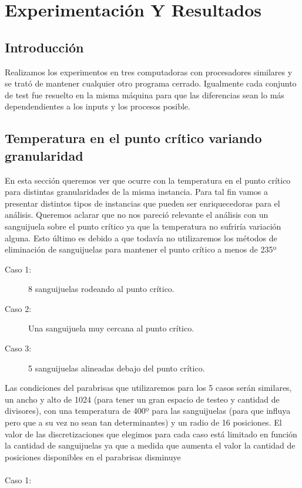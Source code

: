 \clearpage
\section{Experimentación Y Resultados}

\subsection{Introducción}
 Realizamos los experimentos en tres computadoras con procesadores similares y se trató de mantener cualquier otro programa cerrado. Igualmente cada conjunto de test fue resuelto en la misma máquina para que las diferencias sean lo más dependendientes a los inputs y los procesos posible.

\subsection{Temperatura en el punto crítico variando granularidad}

En esta sección queremos ver que ocurre con la temperatura en el punto crítico para distintas granularidades de la misma instancia. Para tal fin vamos a presentar distintos tipos de instancias que pueden ser enriquecedoras para el análisis. Queremos aclarar que no nos pareció relevante el análisis con un sanguijuela sobre el punto crítico ya que la temperatura no sufriría variación alguna. Esto último es debido a que todavía no utilizaremos los métodos de eliminación de sanguijuelas para mantener el punto crítico a menos de 235º

\begin{description}

\item[Caso 1:] 8 sanguijuelas rodeando al punto crítico.
\item[Caso 2:] Una sanguijuela muy cercana al punto crítico.
\item[Caso 3:] 5 sanguijuelas alineadas debajo del punto crítico.
\end{description}

Las condiciones del parabrisas que utilizaremos para los 5 casos serán similares, un ancho y alto de 1024 (para tener un gran espacio de testeo y cantidad de divisores), con una temperatura de 400º para las sanguijuelas (para que influya pero que a su vez no sean tan determinantes) y un radio de 16 posiciones. El valor de las discretizaciones que elegimos para cada caso está limitado en función la cantidad de sanguijuelas ya que a medida que aumenta el valor la cantidad de posiciones disponibles en el parabrisas disminuye\\ \\
\newpage
Caso 1:

